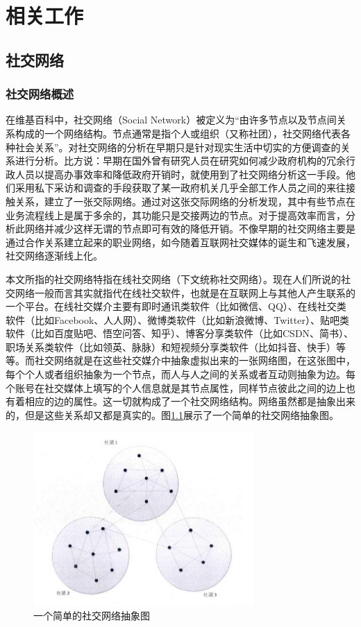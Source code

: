 \chapter{相关工作}
\section{社交网络}
\subsection{社交网络概述}
在维基百科中，社交网络（Social Network）被定义为“由许多节点以及节点间关系构成的一个网络结构。节点通常是指个人或组织（又称社团），社交网络代表各种社会关系”。对社交网络的分析在早期只是针对现实生活中切实的方便调查的关系进行分析。比方说：早期在国外曾有研究人员在研究如何减少政府机构的冗余行政人员以提高办事效率和降低政府开销时，就使用到了社交网络分析这一手段。他们采用私下采访和调查的手段获取了某一政府机关几乎全部工作人员之间的来往接触关系，建立了一张交际网络。通过对这张交际网络的分析发现，其中有些节点在业务流程线上是属于多余的，其功能只是交接两边的节点。对于提高效率而言，分析此网络并减少这样无谓的节点即可有效的降低开销。不像早期的社交网络主要是通过合作关系建立起来的职业网络，如今随着互联网社交媒体的诞生和飞速发展，社交网络逐渐线上化。

本文所指的社交网络特指在线社交网络（下文统称社交网络）。现在人们所说的社交网络一般而言其实就指代在线社交软件，也就是在互联网上与其他人产生联系的一个平台。在线社交媒介主要有即时通讯类软件（比如微信、QQ）、在线社交类软件（比如Facebook、人人网）、微博类软件（比如新浪微博、Twitter）、贴吧类软件（比如百度贴吧、悟空问答、知乎）、博客分享类软件（比如CSDN、简书）、职场关系类软件（比如领英、脉脉）和短视频分享类软件（比如抖音、快手）等等。而社交网络就是在这些社交媒介中抽象虚拟出来的一张网络图，在这张图中，每个个人或者组织抽象为一个节点，而人与人之间的关系或者互动则抽象为边。每个账号在社交媒体上填写的个人信息就是其节点属性，同样节点彼此之间的边上也有着相应的边的属性。这一切就构成了一个社交网络结构。网络虽然都是抽象出来的，但是这些关系却又都是真实的。图\ref{fig:fig2-1}展示了一个简单的社交网络抽象图。

\begin{figure}
  \centering
  \includegraphics[width=0.75\textwidth]{figures/fig2-1}
  \caption{一个简单的社交网络抽象图}\label{fig:fig2-1}
\end{figure}

